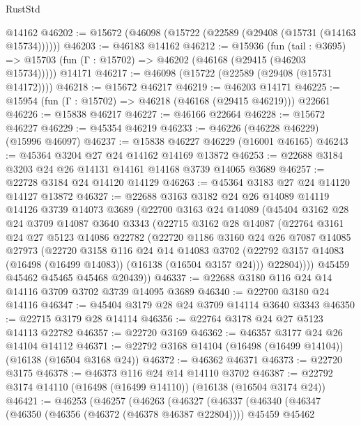 \begin{lexlean}{RustStd}
\begin{coremodule}
    @14162
@46202 := @15672 (@46098 (@15722 (@22589 (@29408 (@15731 (@14163 @15734))))))
@46203 := @46183 @14162
@46212 := @15936
    (fun (tail : @3695) => @15703 (fun (Γ : @15702) => @46202 (@46168 (@29415 (@46203 @15734)))))
    @14171
@46217 := @46098 (@15722 (@22589 (@29408 (@15731 @14172))))
@46218 := @15672 @46217
@46219 := @46203 @14171
@46225 := @15954 (fun (Γ : @15702) => @46218 (@46168 (@29415 @46219))) @22661
@46226 := @15838 @46217
@46227 := @46166 @22664
@46228 := @15672 @46227
@46229 := @45354 @46219
@46233 := @46226 (@46228 @46229) (@15996 @46097)
@46237 := @15838 @46227 @46229 (@16001 @46165)
@46243 := @45364 @3204 @27 @24 @14162 @14169 @13872
@46253 := @22688 @3184 @3203 @24 @26 @14131 @14161 @14168 @3739 @14065 @3689
@46257 := @22728 @3184 @24 @14120 @14129
@46263 := @45364 @3183 @27 @24 @14120 @14127 @13872
@46327 := @22688
    @3163
    @3182
    @24
    @26
    @14089
    @14119
    @14126
    @3739
    @14073
    @3689
    (@22700
      @3163
      @24
      @14089
      (@45404
        @3162
        @28
        @24
        @3709
        @14087
        @3640
        @3343
        (@22715
          @3162
          @28
          @14087
          (@22764
            @3161
            @24
            @27
            @5123
            @14086
            @22782
            (@22720
              @1186
              @3160
              @24
              @26
              @7087
              @14085
              @27973
              (@22720
                @3158
                @116
                @24
                @14
                @14083
                @3702
                (@22792 @3157 @14083 (@16498 (@16499 @14083)) (@16138 (@16504 @3157 @24)))
                @22804))))
        @45459
        @45462
        @45465
        @45468
        @20439))
@46337 := @22688 @3180 @116 @24 @14 @14116 @3709 @3702 @3739 @14095 @3689
@46340 := @22700 @3180 @24 @14116
@46347 := @45404 @3179 @28 @24 @3709 @14114 @3640 @3343
@46350 := @22715 @3179 @28 @14114
@46356 := @22764 @3178 @24 @27 @5123 @14113 @22782
@46357 := @22720 @3169
@46362 := @46357 @3177 @24 @26 @14104 @14112
@46371 := @22792 @3168 @14104 (@16498 (@16499 @14104)) (@16138 (@16504 @3168 @24))
@46372 := @46362 @46371
@46373 := @22720 @3175
@46378 := @46373 @116 @24 @14 @14110 @3702
@46387 := @22792 @3174 @14110 (@16498 (@16499 @14110)) (@16138 (@16504 @3174 @24))
@46421 := @46253
    (@46257
      (@46263
        (@46327
          (@46337
            (@46340
              (@46347
                (@46350 (@46356 (@46372 (@46378 @46387 @22804))))
                @45459
                @45462

\end{coremodule}
\end{lexlean}
